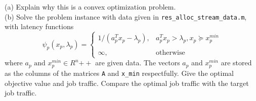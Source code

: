 \documentclass{article}
\begin{document}
(a) Explain why this is a convex optimization problem.\\


(b) Solve the problem instance with data given in \verb|res_alloc_stream_data.m|, with latency functions 
$$
\psi_p(x_p, \lambda_p) = 
\begin{cases}
	1 / (a_p^T x_p - \lambda_p), & a_p^T x_p > \lambda_p,  
	x_p \succeq x_p^{min} \\
	\\
	\infty, & \text{otherwise}
\end{cases}
$$
where $a_p \text{ and }x_p^{min}\in R^n{++}$ are given data.
The vectors $a_p$ and $x_p^{min}$ are stored as the columns of the matrices \verb|A| and \verb|x_min| respectfully.
Give the optimal objective value and job traffic. Compare the optimal job traffic with the target job traffic.
\end{document}
